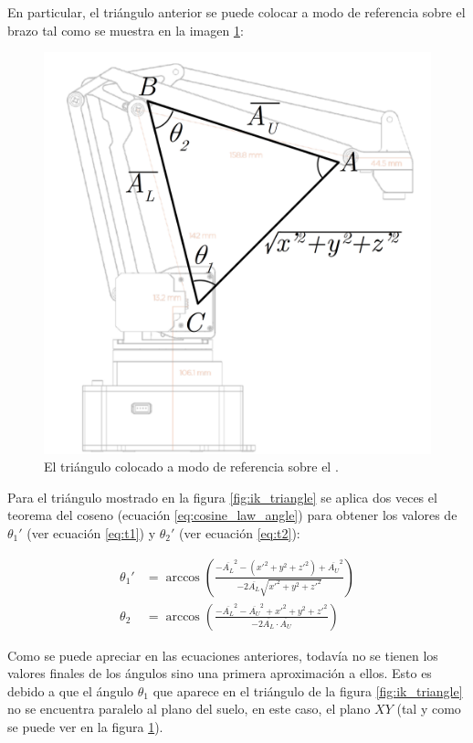 En particular, el triángulo anterior se puede colocar a modo de
referencia sobre el brazo tal como se muestra en la imagen \ref{fig:u_triangle_over_arm}:

\begin{figure}[H]
    \centering
    \includegraphics[width=.6\linewidth]{pictures/ik_triangle_over_arm.png}
    \caption{El triángulo colocado a modo de referencia sobre el \pArm{}.}
    \label{fig:u_triangle_over_arm}
\end{figure}

Para el triángulo mostrado en la figura \ref{fig:ik_triangle} se aplica
dos veces el teorema del coseno (ecuación \ref{eq:cosine_law_angle}) para obtener
los valores de $\theta_1'$ (ver ecuación \ref{eq:t1}) y $\theta_2'$ (ver ecuación \ref{eq:t2}):

\begin{align}
    \theta_1' & = \arccos{\left(\frac{-\overline{A_L}^2 - \left(x'^2 + y^2 + z'^2\right) + \overline{A_U}^2} %
    {-2 \overline{A_L} \sqrt{x'^2 + y^2 + z'^2}}\right)} \label{eq:t1} \\[2ex]
    \theta_2 & = \arccos{\left(\frac{-\overline{A_L}^2 - \overline{A_U}^2 + x'^2 + y^2 + z'^2} %
    {-2 \overline{A_L} \cdot \overline{A_U}}\right)} \label{eq:t2}
\end{align}

Como se puede apreciar en las ecuaciones anteriores, todavía no se tienen los valores finales
de los ángulos sino una primera aproximación a ellos. Esto es debido a que el ángulo
$\theta_1$ que aparece en el triángulo de la figura \ref{fig:ik_triangle}
no se encuentra paralelo al plano del suelo, en este caso, el plano $XY$ (tal y como se puede ver
en la figura \ref{fig:u_triangle_over_arm}).

